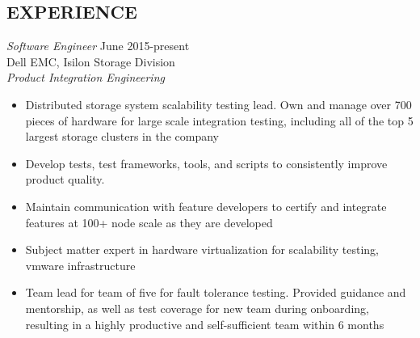 \documentclass[line, margin]{res}
\begin{document}
\address{500 Elliott Ave W Apt 308, Seattle, WA 98119}
\address{253-508-2725}

 
\begin{resume}

 
 
\section{EXPERIENCE} 
                {\sl Software Engineer} \hfill June 2015-present \\
                Dell EMC, Isilon Storage Division\\
                {\sl Product Integration Engineering}
                 \begin{itemize}  \itemsep -2pt %
                \item Distributed storage system scalability testing lead. 
                   Own and manage over 700 pieces of hardware for large scale 
                       integration testing, including all of the top 5 largest
                       storage clusters in the company

                \item Develop tests, test frameworks, tools, and scripts to
                   consistently improve product quality. 

                \item Maintain communication with feature developers to certify
                   and integrate features at 100+ node scale as they are developed

                \item Subject matter expert in hardware virtualization
                   for scalability testing, vmware infrastructure

                \item Team lead for team of five for fault tolerance testing.
                   Provided guidance and mentorship, as well as test coverage
                       for new team during onboarding, resulting in a highly productive
                       and self-sufficient team within 6 months


\end{itemize}
\end{resume}
\end{document}

